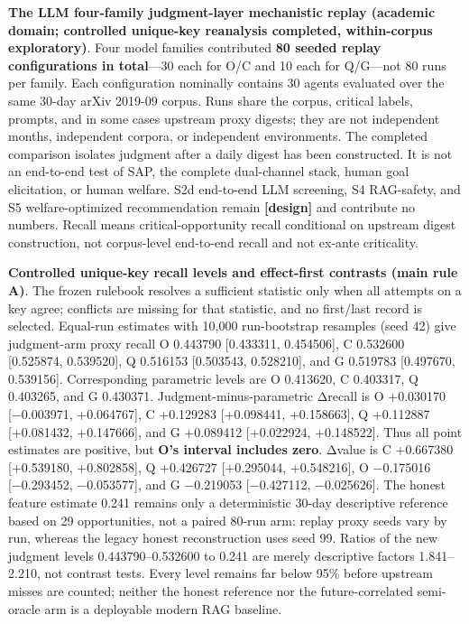 \documentclass[
  11pt]{article}
\begin{document}
\textbf{The LLM four-family judgment-layer mechanistic replay (academic
domain; controlled unique-key reanalysis completed, within-corpus
exploratory)}. Four model families contributed \textbf{80 seeded replay
configurations in total}---30 each for O/C and 10 each for Q/G---not 80
runs per family. Each configuration nominally contains 30 agents
evaluated over the same 30-day arXiv 2019-09 corpus. Runs share the
corpus, critical labels, prompts, and in some cases upstream proxy
digests; they are not independent months, independent corpora, or
independent environments. The completed comparison isolates judgment
after a daily digest has been constructed. It is not an end-to-end test
of SAP, the complete dual-channel stack, human goal elicitation, or
human welfare. S2d end-to-end LLM screening, S4 RAG-safety, and S5
welfare-optimized recommendation remain \textbf{{[}design{]}} and
contribute no numbers. Recall means critical-opportunity recall
conditional on upstream digest construction, not corpus-level end-to-end
recall and not ex-ante criticality.

\textbf{Controlled unique-key recall levels and effect-first contrasts
(main rule A)}. The frozen rulebook resolves a sufficient statistic only
when all attempts on a key agree; conflicts are missing for that
statistic, and no first/last record is selected. Equal-run estimates
with 10,000 run-bootstrap resamples (seed 42) give judgment-arm proxy
recall O 0.443790 {[}0.433311, 0.454506{]}, C 0.532600 {[}0.525874,
0.539520{]}, Q 0.516153 {[}0.503543, 0.528210{]}, and G 0.519783
{[}0.497670, 0.539156{]}. Corresponding parametric levels are O
0.413620, C 0.403317, Q 0.403265, and G 0.430371.
Judgment-minus-parametric Δrecall is O +0.030170 {[}−0.003971,
+0.064767{]}, C +0.129283 {[}+0.098441, +0.158663{]}, Q +0.112887
{[}+0.081432, +0.147666{]}, and G +0.089412 {[}+0.022924, +0.148522{]}.
Thus all point estimates are positive, but \textbf{O's interval includes
zero}. Δvalue is C +0.667380 {[}+0.539180, +0.802858{]}, Q +0.426727
{[}+0.295044, +0.548216{]}, O −0.175016 {[}−0.293452, −0.053577{]}, and
G −0.219053 {[}−0.427112, −0.025626{]}. The honest feature estimate
0.241 remains only a deterministic 30-day descriptive reference based on
29 opportunities, not a paired 80-run arm: replay proxy seeds vary by
run, whereas the legacy honest reconstruction uses seed 99. Ratios of
the new judgment levels 0.443790--0.532600 to 0.241 are merely
descriptive factors 1.841--2.210, not contrast tests. Every level
remains far below 95\% before upstream misses are counted; neither the
honest reference nor the future-correlated semi-oracle arm is a
deployable modern RAG baseline.
\end{document}
